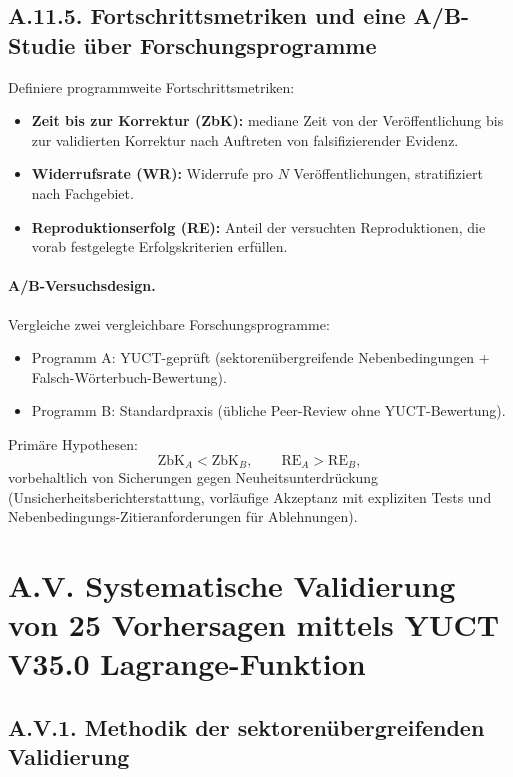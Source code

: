 \documentclass[13pt,a4paper]{article}
\begin{document}
	\subsection*{A.11.5. Fortschrittsmetriken und eine A/B-Studie über Forschungsprogramme}
	Definiere programmweite Fortschrittsmetriken:
	\begin{itemize}[leftmargin=*]
		\item \textbf{Zeit bis zur Korrektur (ZbK):} mediane Zeit von der Veröffentlichung bis zur validierten Korrektur nach Auftreten von falsifizierender Evidenz.
		\item \textbf{Widerrufsrate (WR):} Widerrufe pro $N$ Veröffentlichungen, stratifiziert nach Fachgebiet.
		\item \textbf{Reproduktionserfolg (RE):} Anteil der versuchten Reproduktionen, die vorab festgelegte Erfolgskriterien erfüllen.
	\end{itemize}
	
	\paragraph{A/B-Versuchsdesign.}
	Vergleiche zwei vergleichbare Forschungsprogramme:
	\begin{itemize}[leftmargin=*]
		\item Programm A: YUCT-geprüft (sektorenübergreifende Nebenbedingungen + Falsch-Wörterbuch-Bewertung).
		\item Programm B: Standardpraxis (übliche Peer-Review ohne YUCT-Bewertung).
	\end{itemize}
	Primäre Hypothesen:
	$$ \mathrm{ZbK}_A < \mathrm{ZbK}_B,\qquad \mathrm{RE}_A > \mathrm{RE}_B, $$
	vorbehaltlich von Sicherungen gegen Neuheitsunterdrückung (Unsicherheitsberichterstattung, vorläufige Akzeptanz mit expliziten Tests und Nebenbedingungs-Zitieranforderungen für Ablehnungen).
	
	\section*{A.V. Systematische Validierung von 25 Vorhersagen mittels YUCT V35.0 Lagrange-Funktion}
	
	\subsection*{A.V.1. Methodik der sektorenübergreifenden Validierung}
	
\end{document}

